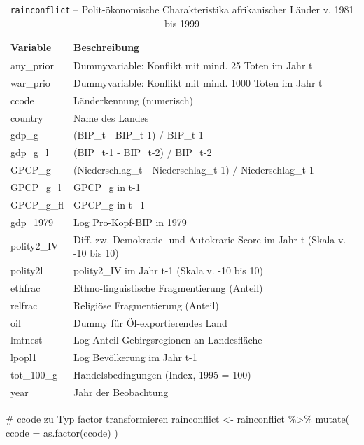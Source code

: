 \documentclass[
  a4paper,
  DIV=11,
  oneside]{scrreprt}
\newenvironment{Shaded}{\begin{snugshade}}{\end{snugshade}}
\newcommand{\AttributeTok}[1]{\textcolor[rgb]{0.40,0.45,0.13}{#1}}
\newcommand{\CommentTok}[1]{\textcolor[rgb]{0.37,0.37,0.37}{#1}}
\newcommand{\FunctionTok}[1]{\textcolor[rgb]{0.28,0.35,0.67}{#1}}
\newcommand{\NormalTok}[1]{\textcolor[rgb]{0.00,0.23,0.31}{#1}}
\newcommand{\OtherTok}[1]{\textcolor[rgb]{0.00,0.23,0.31}{#1}}
\newcommand{\SpecialCharTok}[1]{\textcolor[rgb]{0.37,0.37,0.37}{#1}}
\begin{document}
\begingroup
\setlength{}
\setlength{}\fontsize{12.0pt}{14.4pt}\selectfont

\begin{longtable}{@{\extracolsep{\fill}}ll}

\caption{\label{tbl-rainconfdata}\texttt{rainconflict} --
Polit-ökonomische Charakteristika afrikanischer Länder v. 1981 bis 1999}

\tabularnewline

\toprule
Variable & Beschreibung \\ 
\midrule\addlinespace[2.5pt]
any\_prior & Dummyvariable: Konflikt mit mind. 25 Toten im Jahr t \\ 
war\_prio & Dummyvariable: Konflikt mit mind. 1000 Toten im Jahr t \\ 
ccode & Länderkennung (numerisch) \\ 
country & Name des Landes \\ 
gdp\_g & (BIP\_t - BIP\_t-1) / BIP\_t-1 \\ 
gdp\_g\_l & (BIP\_t-1 - BIP\_t-2) / BIP\_t-2 \\ 
GPCP\_g & (Niederschlag\_t - Niederschlag\_t-1) / Niederschlag\_t-1 \\ 
GPCP\_g\_l & GPCP\_g in t-1 \\ 
GPCP\_g\_fl & GPCP\_g in t+1 \\ 
gdp\_1979 & Log Pro-Kopf-BIP in 1979 \\ 
polity2\_IV & Diff. zw. Demokratie- und Autokrarie-Score im Jahr t (Skala v. -10 bis 10) \\ 
polity2l & polity2\_IV im Jahr t-1 (Skala v. -10 bis 10) \\ 
ethfrac & Ethno-linguistische Fragmentierung (Anteil) \\ 
relfrac & Religiöse Fragmentierung (Anteil) \\ 
oil & Dummy für Öl-exportierendes Land \\ 
lmtnest & Log Anteil Gebirgsregionen an Landesfläche \\ 
lpopl1 & Log Bevölkerung im Jahr t-1 \\ 
tot\_100\_g & Handelsbedingungen (Index, 1995 = 100) \\ 
year & Jahr der Beobachtung \\ 
\bottomrule

\end{longtable}

\endgroup

\begin{Shaded}
\begin{Highlighting}[]
\CommentTok{\# ccode zu Typ \textquotesingle{}factor\textquotesingle{} transformieren}
\NormalTok{rainconflict }\OtherTok{\textless{}{-}}\NormalTok{ rainconflict }\SpecialCharTok{\%\textgreater{}\%} 
  \FunctionTok{mutate}\NormalTok{(}
    \AttributeTok{ccode =} \FunctionTok{as.factor}\NormalTok{(ccode)}
\NormalTok{  )}
\end{Highlighting}
\end{Shaded}
\end{document}
